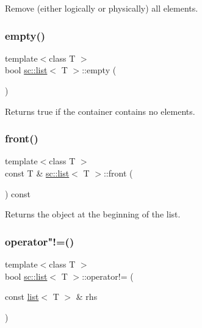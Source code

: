 Remove (either logically or physically) all elements. 

\mbox{\label{classsc_1_1list_a8599ccd8f27e0f39a1c3051cd9d05bdb}} 
\subsubsection{\texorpdfstring{empty()}{empty()}}
{\footnotesize\ttfamily template$<$class T $>$ \\
bool \mbox{\hyperlink{classsc_1_1list}{sc\+::list}}$<$ T $>$\+::empty (\begin{DoxyParamCaption}{ }\end{DoxyParamCaption})}



Returns {\ttfamily true} if the container contains no elements. 

\mbox{\label{classsc_1_1list_ae77ff1c80fd6f0e07d397c6305be68be}} 
\subsubsection{\texorpdfstring{front()}{front()}}
{\footnotesize\ttfamily template$<$class T $>$ \\
const T \& \mbox{\hyperlink{classsc_1_1list}{sc\+::list}}$<$ T $>$\+::front (\begin{DoxyParamCaption}{ }\end{DoxyParamCaption}) const}



Returns the object at the beginning of the list. 

\mbox{\label{classsc_1_1list_a3816dba10dfc783cffc373bd601a8b18}} 
\subsubsection{\texorpdfstring{operator"!=()}{operator!=()}}
{\footnotesize\ttfamily template$<$class T $>$ \\
bool \mbox{\hyperlink{classsc_1_1list}{sc\+::list}}$<$ T $>$\+::operator!= (\begin{DoxyParamCaption}\item[{const \mbox{\hyperlink{classsc_1_1list}{list}}$<$ T $>$ \&}]{rhs }\end{DoxyParamCaption})}



